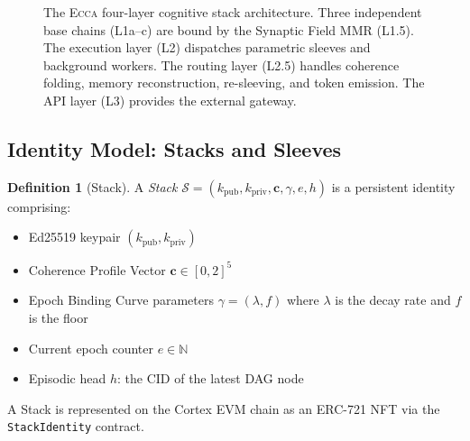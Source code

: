 \documentclass[11pt,twocolumn]{article}
\theoremstyle{definition}
\newtheorem{definition}{Definition}[section]
\theoremstyle{plain}
\theoremstyle{remark}
\newcommand{\ecca}{\textsc{Ecca}}
\newcommand{\N}{\mathbb{N}}
\begin{document}
\begin{figure}[t]
\caption{The \ecca{} four-layer cognitive stack architecture. Three independent base chains (L1a--c) are bound by the Synaptic Field MMR (L1.5). The execution layer (L2) dispatches parametric sleeves and background workers. The routing layer (L2.5) handles coherence folding, memory reconstruction, re-sleeving, and token emission. The API layer (L3) provides the external gateway.}
\label{fig:architecture}
\end{figure}

\subsection{Identity Model: Stacks and Sleeves}

\begin{definition}[Stack]\label{def:stack}
A \emph{Stack} $\mathcal{S} = (k_{\mathrm{pub}}, k_{\mathrm{priv}}, \mathbf{c}, \gamma, e, h)$ is a persistent identity comprising:
\begin{itemize}[leftmargin=*,itemsep=1pt]
  \item Ed25519 keypair $(k_{\mathrm{pub}}, k_{\mathrm{priv}})$
  \item Coherence Profile Vector $\mathbf{c} \in [0,2]^5$
  \item Epoch Binding Curve parameters $\gamma = (\lambda, f)$ where $\lambda$ is the decay rate and $f$ is the floor
  \item Current epoch counter $e \in \N$
  \item Episodic head $h$: the CID of the latest DAG node
\end{itemize}
A Stack is represented on the Cortex EVM chain as an ERC-721 NFT via the \texttt{StackIdentity} contract.
\end{definition}
\end{document}
